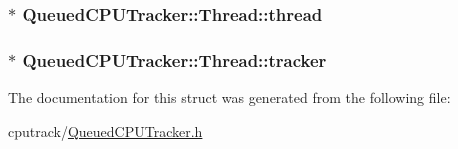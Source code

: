 \subsubsection[{\texorpdfstring{thread}{thread}}]{$\ast$ Queued\+C\+P\+U\+Tracker\+::\+Thread\+::thread}\hypertarget{struct_queued_c_p_u_tracker_1_1_thread_a57d33b7cdece9a412b3baa33481645d1}{}\label{struct_queued_c_p_u_tracker_1_1_thread_a57d33b7cdece9a412b3baa33481645d1}
\subsubsection[{\texorpdfstring{tracker}{tracker}}]{$\ast$ Queued\+C\+P\+U\+Tracker\+::\+Thread\+::tracker}\hypertarget{struct_queued_c_p_u_tracker_1_1_thread_a03a8b50f8a9667f41a4eb72754ec2a69}{}\label{struct_queued_c_p_u_tracker_1_1_thread_a03a8b50f8a9667f41a4eb72754ec2a69}


The documentation for this struct was generated from the following file\+:\begin{DoxyCompactItemize}
\item 
cputrack/\hyperlink{_queued_c_p_u_tracker_8h}{Queued\+C\+P\+U\+Tracker.\+h}\end{DoxyCompactItemize}
